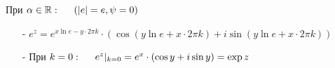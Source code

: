 При $\alpha\in\mathbb{R}:\hspace*{0.5cm} (|e|=e,\psi=0)$
\begin{itemize}
	\item[-]  $e^z=e^{x\ln e-y\cdot2\pi k}\cdot(\cos(y\ln e+x\cdot2\pi k)+i\sin(y\ln e+x\cdot2\pi k))$
	\item[-] При $k=0:\hspace*{0.5cm} e^z|_{k=0}=e^{x}\cdot(\cos y+i\sin y)=\exp z$
\end{itemize}



























